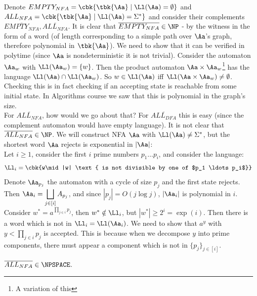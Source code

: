 \begin{example}
	Denote $EMPTY_{NFA} = \cbk{\tbk{\Aa}\mid \Ll(\Aa) = \emptyset}$ and $ALL_{NFA} = \cbk{\tbk{\Aa}\mid \Ll(\Aa) = \Sigma^*}$ and consider their complements $\overline{EMPTY_{NFA}}, \overline{ALL_{NFA}}$. It is clear that $\overline{EMPTY_{NFA}}\in \NP$ - by the witness in the form of a word (of length corresponding to a simple path over $\Aa$'s graph, therefore polynomial in $\tbk{\Aa}$). We need to show that it can be verified in polytime (since $\Aa$ is nondeterministic it is not trivial). Consider the automaton $\Aa_w$  with $\Ll(\Aa_w) = \{w\}$. Then the product automaton $\Aa\times \Aa_w$\footnote{A variation of this} has the language $\Ll(\Aa)\cap \Ll(\Aa_w)$. So $w\in \Ll(\Aa)$ iff $\Ll(\Aa\times \Aa_w)\neq \emptyset$. Checking this is in fact checking if an accepting state is reachable from some initial state. In Algorithms course we saw that this is polynomial in the graph's size.\\
	
	For $\overline{ALL_{NFA}}$, how would we go about that? For $\overline{ALL_{DFA}}$ this is easy (since the complement automaton would have empty language). It is not clear that $\overline{ALL_{NFA}}\in \NP$. We will construct NFA $\Aa$ with $\Ll(\Aa)\neq \Sigma^*$, but the shortest word $\Aa$ rejects is exponential in $|\Aa|$:\\
	Let $i\geq 1$, consider the first $i$ prime numbers $p_1\ldots p_i$, and consider the language: $$\Ll_i = \cbk{w\mid |w| \text{ is not divisible by one of $p_1 \ldots p_i$}}$$
	Denote $\Aa_{p_j}$ the automaton with a cycle of size $p_j$ and the first state rejects. Then $\Aa_i = {\displaystyle \bigsqcup_{j\in [i]} A_{p_j}}$, and since $|p_j| = O(j\log j)$, $|\Aa_i|$ is polynomial in $i$. Consider $w^* = a^{\prod_{j\in i}p_j}$, then $w^*\notin \Ll_i$, but $|w^*| \geq 2^i= \exp(i)$. Then there is a word which is not in $\Ll_i = \Ll(\Aa_i)$. We need to show that $a^y$ with $y<\prod_{j\in i}p_j$ is accepted. This is because when we decompose $y$ into prime components, there must appear a component which is not in $\{p_j\}_{j\in [i]}$.
\end{example}
\begin{claim}
	$\overline{ALL_{NFA}}\in \NPSPACE$.
\end{claim}
